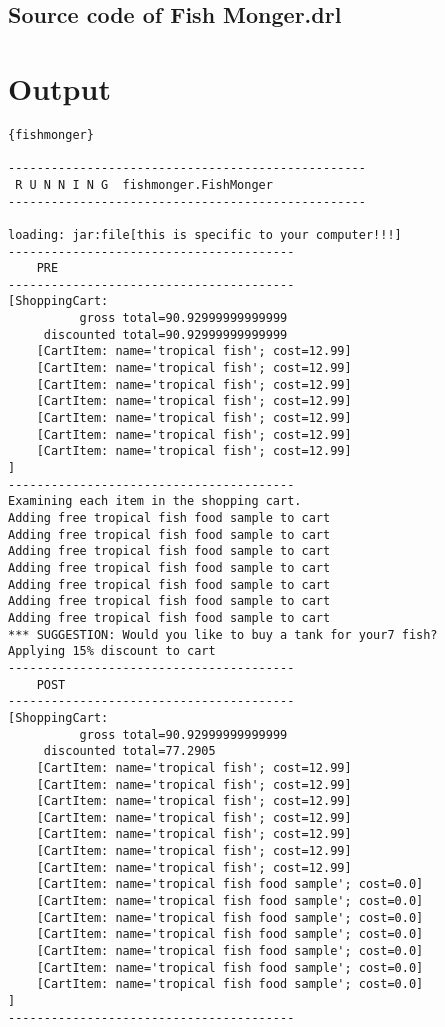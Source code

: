 \subsection{Source code of Fish Monger.drl}






\cleardoublepage
\section {Output}
\begin{lstlisting}{fishmonger}

--------------------------------------------------
 R U N N I N G  fishmonger.FishMonger
--------------------------------------------------

loading: jar:file[this is specific to your computer!!!]
----------------------------------------
    PRE
----------------------------------------
[ShoppingCart:
	      gross total=90.92999999999999
	 discounted total=90.92999999999999
	[CartItem: name='tropical fish'; cost=12.99]
	[CartItem: name='tropical fish'; cost=12.99]
	[CartItem: name='tropical fish'; cost=12.99]
	[CartItem: name='tropical fish'; cost=12.99]
	[CartItem: name='tropical fish'; cost=12.99]
	[CartItem: name='tropical fish'; cost=12.99]
	[CartItem: name='tropical fish'; cost=12.99]
]
----------------------------------------
Examining each item in the shopping cart.
Adding free tropical fish food sample to cart
Adding free tropical fish food sample to cart
Adding free tropical fish food sample to cart
Adding free tropical fish food sample to cart
Adding free tropical fish food sample to cart
Adding free tropical fish food sample to cart
Adding free tropical fish food sample to cart
*** SUGGESTION: Would you like to buy a tank for your7 fish?
Applying 15% discount to cart
----------------------------------------
    POST
----------------------------------------
[ShoppingCart:
	      gross total=90.92999999999999
	 discounted total=77.2905
	[CartItem: name='tropical fish'; cost=12.99]
	[CartItem: name='tropical fish'; cost=12.99]
	[CartItem: name='tropical fish'; cost=12.99]
	[CartItem: name='tropical fish'; cost=12.99]
	[CartItem: name='tropical fish'; cost=12.99]
	[CartItem: name='tropical fish'; cost=12.99]
	[CartItem: name='tropical fish'; cost=12.99]
	[CartItem: name='tropical fish food sample'; cost=0.0]
	[CartItem: name='tropical fish food sample'; cost=0.0]
	[CartItem: name='tropical fish food sample'; cost=0.0]
	[CartItem: name='tropical fish food sample'; cost=0.0]
	[CartItem: name='tropical fish food sample'; cost=0.0]
	[CartItem: name='tropical fish food sample'; cost=0.0]
	[CartItem: name='tropical fish food sample'; cost=0.0]
]
----------------------------------------
\end{lstlisting}

